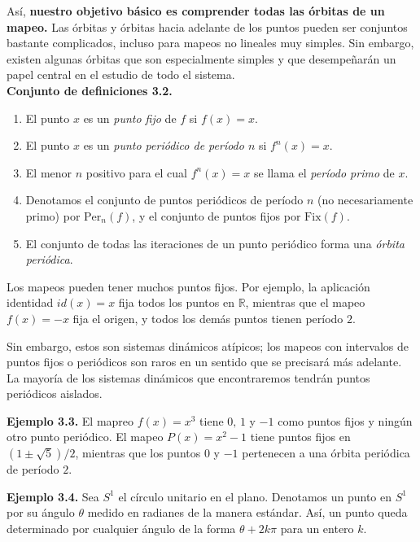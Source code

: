 \documentclass[10pt,a4paper]{book}
\begin{document}
Así, \textbf{nuestro objetivo básico es comprender todas las órbitas de un mapeo.} Las órbitas y órbitas hacia adelante de los puntos pueden ser conjuntos bastante complicados, incluso para mapeos no lineales muy simples. Sin embargo, existen algunas órbitas que son especialmente simples y que desempeñarán un papel 
central en el estudio de todo el sistema.
\\

\textbf{Conjunto de definiciones 3.2.} 
\begin{enumerate}
	\item El punto $x$ es un \emph{punto fijo} de $f$ si $f(x)=x$.  
	\item El punto $x$ es un \emph{punto periódico de período $n$} si $f^{n}(x)=x$.  
	\item El menor $n$ positivo para el cual $f^{n}(x)=x$ se llama el \emph{período primo} de $x$.  
	\item Denotamos el conjunto de puntos periódicos de período $n$ (no necesariamente primo) por $\mathrm{Per}_{n}(f)$, y el conjunto de puntos fijos por $\mathrm{Fix}(f)$. 
	\item El conjunto de todas las iteraciones de un punto periódico forma una \emph{órbita periódica}.  
\end{enumerate}

Los mapeos pueden tener muchos puntos fijos.  
Por ejemplo, la aplicación identidad $id(x)=x$ fija todos los puntos en $\mathbb{R}$,  
mientras que el mapeo $f(x)=-x$ fija el origen, y todos los demás puntos tienen período $2$.  

Sin embargo, estos son sistemas dinámicos atípicos;  
los mapeos con intervalos de puntos fijos o periódicos son raros en un sentido que se precisará más adelante.  
La mayoría de los sistemas dinámicos que encontraremos tendrán puntos periódicos aislados.


\newpage

\textbf{Ejemplo 3.3.} El mapreo $f(x) = x^{3}$ tiene $0,\,1$ y $-1$ como puntos fijos 
y ningún otro punto periódico.  
El mapeo $P(x) = x^{2}-1$ tiene puntos fijos en $(1 \pm \sqrt{5})/2$, 
mientras que los puntos $0$ y $-1$ pertenecen a una órbita periódica de período $2$.

\medskip

\textbf{Ejemplo 3.4.} Sea $S^{1}$ el círculo unitario en el plano. Denotamos un punto en $S^{1}$ por su ángulo $\theta$ medido en radianes de la manera estándar. Así, un punto queda determinado por cualquier ángulo de la forma $\theta + 2k\pi$ para un entero $k$.  
\end{document}
